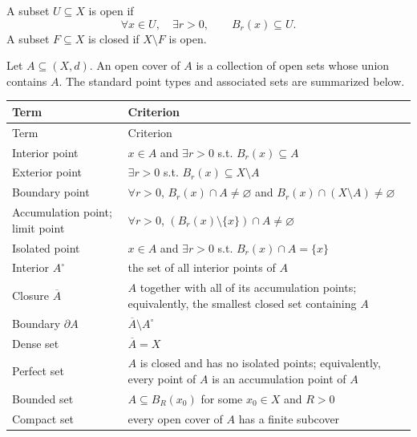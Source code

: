     \begin{definition}
        A subset $U\subseteq X$ is open if
        \[
            \forall x\in U,
            \quad
            \exists r>0,
            \qquad
            B_r(x)\subseteq U.
        \]
        A subset $F\subseteq X$ is closed if $X\setminus F$ is open.
    \end{definition}

    \begin{definition}
        Let $A\subseteq(X,d)$. An open cover of $A$ is a collection of open
        sets whose union contains $A$. The standard point types and associated
        sets are summarized below.

        {\small
        \renewcommand{\arraystretch}{1.16}
        \begin{longtable}{@{}L{0.22\textwidth}L{0.70\textwidth}@{}}
            \toprule
            Term & Criterion \\
            \midrule
            \endfirsthead

            \toprule
            Term & Criterion \\
            \midrule
            \endhead

            \bottomrule
            \endlastfoot

            Interior point & $x\in A$ and $\exists r>0$ s.t. $B_r(x)\subseteq A$ \\
            Exterior point & $\exists r>0$ s.t. $B_r(x)\subseteq X\setminus A$ \\
            Boundary point & $\forall r>0$, $B_r(x)\cap A\neq\varnothing$ and
                $B_r(x)\cap(X\setminus A)\neq\varnothing$ \\
            Accumulation point; limit point & $\forall r>0$,
                $(B_r(x)\setminus\{x\})\cap A\neq\varnothing$ \\
            Isolated point & $x\in A$ and $\exists r>0$ s.t.
                $B_r(x)\cap A=\{x\}$ \\
            Interior $A^\circ$ & the set of all interior points of $A$ \\
            Closure $\overline{A}$ & $A$ together with all of its accumulation points;
                equivalently, the smallest closed set containing $A$ \\
            Boundary $\partial A$ & $\overline{A}\setminus A^\circ$ \\
            Dense set & $\overline{A}=X$ \\
            Perfect set & $A$ is closed and has no isolated points; equivalently,
                every point of $A$ is an accumulation point of $A$ \\
            Bounded set & $A\subseteq B_R(x_0)$ for some $x_0\in X$ and $R>0$ \\
            Compact set & every open cover of $A$ has a finite subcover \\
        \end{longtable}
        }


\end{definition}
